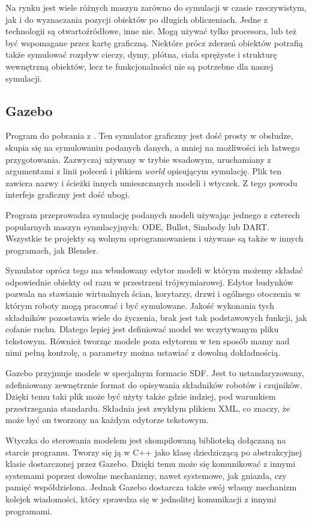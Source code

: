 Na rynku jest wiele różnych maszyn zarówno do symulacji w czasie rzeczywistym, jak i do wyznaczania pozycji obiektów po długich obliczeniach.
Jedne z technologii są otwartoźródłowe, inne nie. Mogą używać tylko procesora, lub też być wspomagane przez kartę graficzną.
Niektóre prócz zderzeń obiektów potrafią także symulować rozpływ cieczy, dymy, płótna, ciała sprężyste i strukturę wewnętrzną obiektów, lecz te funkcjonalności nie są potrzebne dla naszej symulacji.

\subsection{Gazebo}
Program do pobrania z \cite{gazebo_website}. Ten symulator graficzny jest dość prosty w obsłudze, skupia się na symulowaniu podanych danych, a mniej na możliwości ich łatwego przygotowania.
Zazwyczaj używany w trybie wsadowym, uruchamiany z argumentami z linii poleceń i plikiem \emph{world} opisującym symulację.
Plik ten zawiera nazwy i ścieżki innych umieszczanych modeli i wtyczek.
Z tego powodu interfejs graficzny jest dość ubogi.

Program przeprowadza symulację podanych modeli używając jednego z czterech popularnych maszyn symulacyjnych: ODE, Bullet, Simbody lub DART.
Wszystkie te projekty są wolnym oprogramowaniem i używane są także w innych programach, jak Blender.

Symulator oprócz tego ma wbudowany edytor modeli w którym możemy składać odpowiednie obiekty od razu w przestrzeni trójwymiarowej.
Edytor budynków pozwala na stawianie wirtualnych ścian, korytarzy, drzwi i ogólnego otoczenia w którym roboty mogą pracować i być symulowane.
Jakość wykonania tych składników pozostawia wiele do życzenia, brak jest tak podstawowych funkcji, jak cofanie ruchu.
Dlatego lepiej jest definiować model we wczytywanym pliku tekstowym.
Również tworząc modele poza edytorem w ten sposób mamy nad nimi pełną kontrolę, a parametry można ustawiać z dowolną dokładnością.

Gazebo przyjmuje modele w specjalnym formacie SDF. Jest to ustandaryzowany, zdefiniowany zewnętrznie format do opisywania składników robotów i czujników.
Dzięki temu taki plik może być użyty także gdzie indziej, pod warunkiem przestrzegania standardu.
Składnia jest zwykłym plikiem XML, co znaczy, że może być on tworzony na każdym edytorze tekstowym.

Wtyczka do sterowania modelem jest skompilowaną biblioteką dołączaną na starcie programu.
Tworzy się ją w C++ jako klasę dziedziczącą po abstrakcyjnej klasie dostarczonej przez Gazebo.
Dzięki temu może się komunikować z innymi systemami poprzez dowolne mechanizmy, nawet systemowe, jak gniazda, czy pamięć współdzielona.
Jednak Gazebo dostarcza także swój własny mechanizm kolejek wiadomości, który sprawdza się w jednolitej komunikacji z innymi programami.

